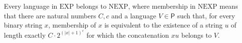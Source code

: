 \begin{theorem}
\label{Complexity.EXP_subset_NEXP}
\leanok
{}
Every language in $\mathrm{EXP}$ belongs to $\mathrm{NEXP}$, where membership in
$\mathrm{NEXP}$ means that there are natural numbers $C,c$ and a language
$V\in\mathsf{P}$ such that, for every binary string $x$, membership of $x$ is equivalent
to the existence of a string $u$ of length exactly $C\cdot 2^{(|x|+1)^c}$ for which the
concatenation $xu$ belongs to $V$.
\end{theorem}
